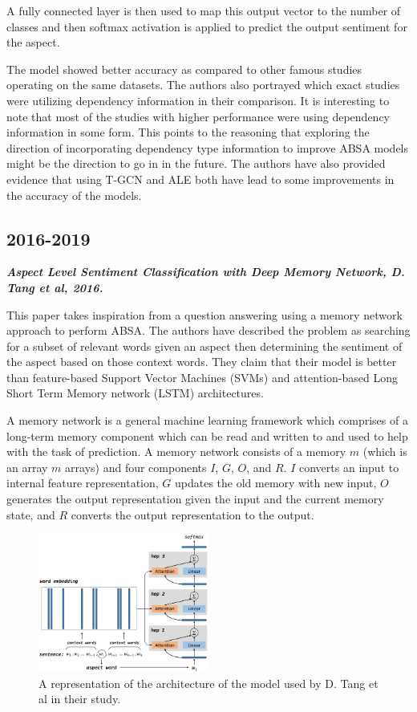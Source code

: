 \documentclass[conference]{IEEEtran}
\begin{document}
A fully connected layer is then used to map this output vector to the number of classes and then softmax activation is applied to predict the output sentiment for the aspect.

The model showed better accuracy as compared to other famous studies operating on the same datasets. The authors also portrayed which exact studies were utilizing dependency information in their comparison. It is interesting to note that most of the studies with higher performance were using dependency information in some form. This points to the reasoning that exploring the direction of incorporating dependency type information to improve ABSA models might be the direction to go in in the future. The authors have also provided evidence that using T-GCN and ALE both have lead to some improvements in the accuracy of the models.

\subsection{2016-2019}

\textit{\textbf{Aspect Level Sentiment Classification with Deep Memory Network, D. Tang et al, 2016.}}

This paper takes inspiration from a question answering using a memory network approach to perform ABSA. The authors have described the problem as searching for a subset of relevant words given an aspect then determining the sentiment of the aspect based on those context words. They claim that their model is better than feature-based Support Vector Machines (SVMs) and attention-based Long Short Term Memory network (LSTM) architectures.

A memory network is a general machine learning framework which comprises of a long-term memory component which can be read and written to and used to help with the task of prediction. A memory network consists of a memory $m$ (which is an array $m$ arrays) and four components $I$, $G$, $O$, and $R$. $I$ converts an input to internal feature representation, $G$ updates the old memory with new input, $O$ generates the output representation given the input and the current memory state, and $R$ converts the output representation to the output.

\begin{figure}[htbp]
\centerline{\includegraphics[keepaspectratio, width=0.5\textwidth]{pics/6.png}}
\caption{A representation of the architecture of the model used by D. Tang et al in their study.}
\label{fig}
\end{figure}
\end{document}
